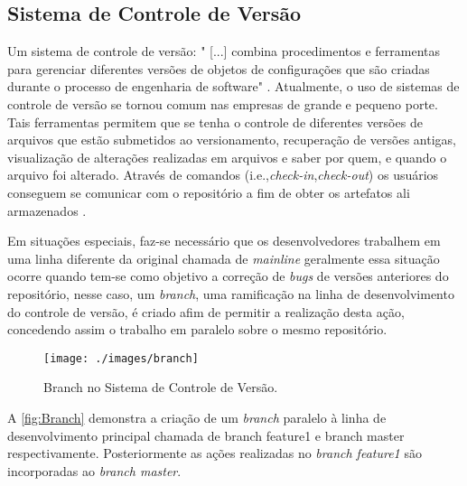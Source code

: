 \subsection{Sistema de Controle de Versão}
Um sistema de controle de versão: "	[...] combina procedimentos e ferramentas para gerenciar diferentes versões de objetos de configurações que são criadas durante o processo de engenharia de software" \cite[p.~927]{pressman2010}.
Atualmente, o uso de sistemas de controle de versão se tornou comum nas empresas de grande e pequeno porte. Tais ferramentas permitem que se tenha o controle de diferentes versões de arquivos que estão submetidos ao versionamento, recuperação de versões antigas, visualização de alterações realizadas em arquivos e saber por quem, e quando o arquivo foi alterado. Através de comandos (i.e.,\textit{check-in},\textit{check-out}) os usuários conseguem se comunicar com o repositório a fim de obter os artefatos ali armazenados \cite{gleiph2011}.

Em situações especiais, faz-se necessário que os desenvolvedores trabalhem em uma linha diferente da original chamada de \textit{mainline} geralmente essa situação ocorre quando tem-se como objetivo a correção de \textit{bugs} de versões anteriores do repositório, nesse caso, um \textit{branch}, uma ramificação na linha de desenvolvimento do controle de versão, é criado afim de permitir a realização desta ação, concedendo assim o trabalho em paralelo sobre o mesmo repositório.
\begin{figure}[h]
\centering
\caption[Branch no Sistema de Controle de Versão]{Branch no Sistema de Controle de Versão.}
\texttt{[image: ./images/branch]}
\label{fig:Branch}
\end{figure}
A \autoref{fig:Branch} demonstra a criação de um \textit{branch} paralelo à linha de desenvolvimento principal chamada de branch feature1 e branch master respectivamente. Posteriormente as ações realizadas no \textit{branch feature1} são incorporadas ao \textit{branch master}.

